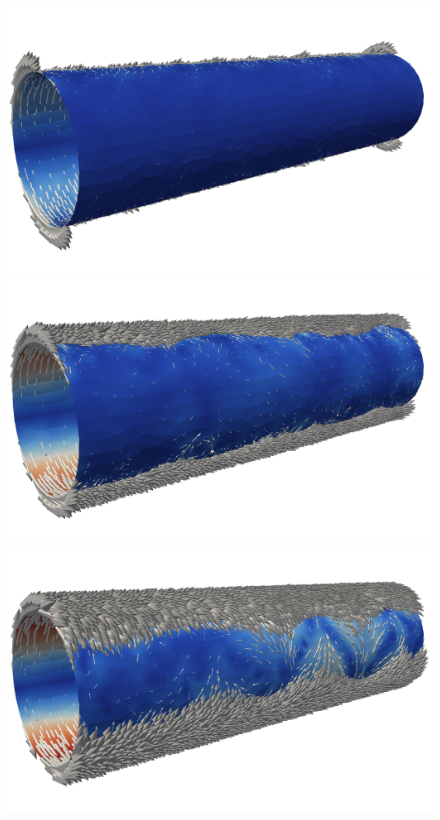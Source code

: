 \begin{figure}
  \centering
  \includegraphics[width=\twofigs]{chapters/hoffman-1/png/Hoffman_fig2a.png}
  \includegraphics[width=\twofigs]{chapters/hoffman-1/png/Hoffman_fig2b.png} \\
  \includegraphics[width=\twofigs]{chapters/hoffman-1/png/Hoffman_fig2c.png}

\end{figure}
